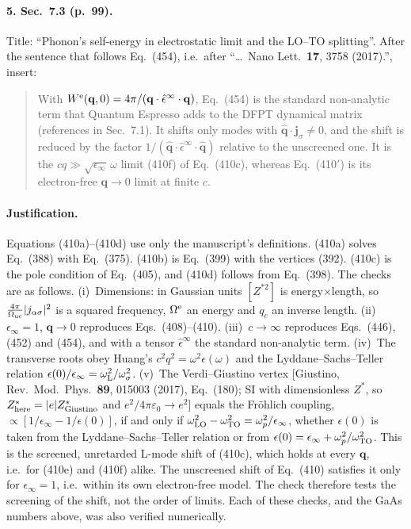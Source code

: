 \paragraph{5. Sec.~7.3 (p.~99).}
Title: ``Phonon's self-energy in electrostatic limit and the LO--TO splitting''. After the
sentence that follows Eq.~(454), i.e.\ after ``\ldots\ Nano Lett.\ \textbf{17}, 3758 (2017).'',
insert:
\begin{quote}
With $W^{\rm e}(\mathbf q,0)=4\pi/(\mathbf q\cdot\hat\epsilon^\infty\cdot\mathbf q)$, Eq.~(454) is
the standard non-analytic term that Quantum Espresso adds to the DFPT dynamical matrix
(references in Sec.~7.1). It shifts only modes with $\hat{\mathbf q}\cdot\mathbf j_\sigma\neq0$,
and the shift is reduced by the factor $1/(\hat{\mathbf q}\cdot\hat\epsilon^\infty\cdot\hat{\mathbf q})$
relative to the unscreened one. It is the $cq\gg\sqrt{\epsilon_\infty}\,\omega$ limit (410f) of
Eq.~(410c), whereas Eq.~(410$'$) is its electron-free $\mathbf q\to0$ limit at finite $c$.
\end{quote}

\paragraph{Justification.}
Equations (410a)--(410d) use only the manuscript's definitions. (410a) solves Eq.~(388) with
Eq.~(375). (410b) is Eq.~(399) with the vertices (392). (410c) is the pole condition of Eq.~(405),
and (410d) follows from Eq.~(398). The checks are as follows.
(i)~Dimensions: in Gaussian units $[Z^{*2}]$ is energy$\times$length, so
$\frac{4\pi}{\Omega_{\rm uc}}|j_{\alpha\sigma}|^2$ is a squared frequency, $\Omega^{\rm e}$ an energy and
$q_c$ an inverse length.
(ii)~$\epsilon_\infty=1$, $\mathbf q\to0$ reproduces Eqs.~(408)--(410).
(iii)~$c\to\infty$ reproduces Eqs.~(446), (452) and (454), and with a tensor $\hat\epsilon^\infty$
the standard non-analytic term.
(iv)~The transverse roots obey Huang's $c^2q^2=\omega^2\epsilon(\omega)$ and the
Lyddane--Sachs--Teller relation $\epsilon(0)/\epsilon_\infty=\omega_{\rm L}^2/\omega_\sigma^2$.
(v)~The Verdi--Giustino vertex [Giustino, Rev.\ Mod.\ Phys.\ \textbf{89}, 015003 (2017), Eq.~(180);
SI with dimensionless $Z^*$, so $Z^*_{\rm here}=|e|Z^*_{\rm Giustino}$ and
$e^2/4\pi\varepsilon_0\to e^2$] equals the Fr\"ohlich coupling, $\propto[1/\epsilon_\infty-1/\epsilon(0)]$,
if and only if $\omega_{\rm LO}^2-\omega_{\rm TO}^2=\omega_p^2/\epsilon_\infty$, whether $\epsilon(0)$
is taken from the Lyddane--Sachs--Teller relation or from $\epsilon(0)=\epsilon_\infty+\omega_p^2/\omega_{\rm TO}^2$.
This is the screened, unretarded L-mode shift of (410c), which holds at every $\mathbf q$, i.e.\
for (410e) and (410f) alike. The unscreened shift of Eq.~(410) satisfies it only for
$\epsilon_\infty=1$, i.e.\ within its own electron-free model. The check therefore tests the
screening of the shift, not the order of limits.
Each of these checks, and the GaAs numbers above, was also verified numerically.
